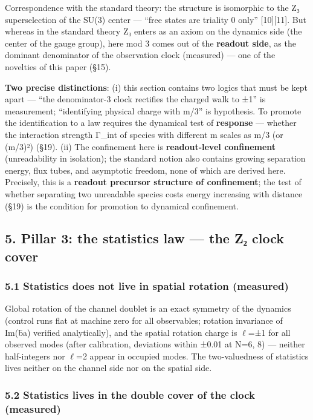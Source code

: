 \documentclass[
]{article}
\newcounter{none} %
\begin{document}
Correspondence with the standard theory: the structure is isomorphic to
the Z₃ superselection of the SU(3) center --- ``free states are triality
0 only'' {[}10{]}{[}11{]}. But whereas in the standard theory Z₃ enters
as an axiom on the dynamics side (the center of the gauge group), here
mod 3 comes out of the \textbf{readout side}, as the dominant
denominator of the observation clock (measured) --- one of the novelties
of this paper (§15).

\textbf{Two precise distinctions}: (i) this section contains two logics
that must be kept apart --- ``the denominator-3 clock rectifies the
charged walk to ±1'' is measurement; ``identifying physical charge with
m/3'' is hypothesis. To promote the identification to a law requires the
dynamical test of \textbf{response} --- whether the interaction strength
Γ\_int of species with different m scales as m/3 (or (m/3)²) (§19). (ii)
The confinement here is \textbf{readout-level confinement}
(unreadability in isolation); the standard notion also contains growing
separation energy, flux tubes, and asymptotic freedom, none of which are
derived here. Precisely, this is a \textbf{readout precursor structure
of confinement}; the test of whether separating two unreadable species
costs energy increasing with distance (§19) is the condition for
promotion to dynamical confinement.

\subsection{5. Pillar 3: the statistics law --- the Z₂ clock
cover}\label{pillar-3-the-statistics-law-the-zux2082-clock-cover}

\subsubsection{5.1 Statistics does not live in spatial rotation
(measured)}\label{statistics-does-not-live-in-spatial-rotation-measured}

Global rotation of the channel doublet is an exact symmetry of the
dynamics (control runs flat at machine zero for all observables;
rotation invariance of Im(b̄a) verified analytically), and the spatial
rotation charge is \(\ell\)=±1 for all observed modes (after
calibration, deviations within ±0.01 at N=6, 8) --- neither
half-integers nor \(\ell\)=2 appear in occupied modes. The
two-valuedness of statistics lives neither on the channel side nor on
the spatial side.

\subsubsection{5.2 Statistics lives in the double cover of the clock
(measured)}\label{statistics-lives-in-the-double-cover-of-the-clock-measured}
\end{document}

